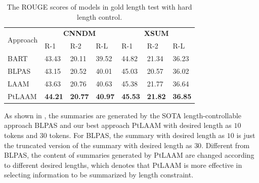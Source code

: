\begin{table}[th]
	\centering
	\scriptsize
	\begin{tabular}{|m{0.8cm}<{\raggedleft}|p{0.45cm}<{\centering}|p{0.45cm}<{\centering}|p{0.45cm}<{\centering}|p{0.45cm}<{\centering}|p{0.45cm}<{\centering}|p{0.45cm}<{\centering}|}
		\hline
		\multirow{2}{*}{Approach} & \multicolumn{3}{c|}{\bf CNNDM} &  \multicolumn{3}{c|}{\bf XSUM} \\ \cline{2-7}
		 &R-1 & R-2 & R-L& R-1 & R-2 & R-L \\
		\hline
		 BART 
		            & 43.43& 20.11 & 39.52 & 44.82 & 21.34 & 36.23  \\
	  BLPAS & 43.15 & 20.52  & 40.01 &45.03 & 20.57 & 36.02  \\
       LAAM & 43.63 & 20.76 & 40.63 & 45.38 & 21.77 & 36.64 \\
     PtLAAM & \bf 44.21&\bf 20.77 &\bf 40.97  & \bf 45.53 &\bf 21.82 & \bf 36.85 \\
		\hline
	\end{tabular}
	\caption{The ROUGE scores of models in gold length test with hard length control. }\label{tab:exact}  
\end{table}

As shown in ,
the summaries are generated by the SOTA length-controllable approach BLPAS 
and our best approach PtLAAM with desired length as $10$ tokens and $30$ tokens.
For BLPAS, the summary with desired length as $10$ is just the truncated version of the summary with desired length as $30$.
Different from BLPAS, the content of summaries generated by PtLAAM are changed according to different desired lengths, which denotes that PtLAAM is more effective in selecting information to be summarized by length constraint. 

